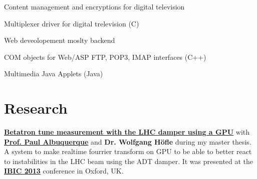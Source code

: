 \documentclass[a4paper]{deedy-resume} %
\begin{document}
\begin{minipage}[t]{0.66\textwidth}
Content management and encryptions for digital television
\begin{tightitemize}
\item Multiplexer driver for digital trelevision (C)
\end{tightitemize}

\sectionspace %



Web deveolopement moslty backend
\begin{tightitemize}
\item COM objects for Web/ASP FTP, POP3, IMAP interfaces (C++)
\item Multimedia Java Applets (Java)
\end{tightitemize}

\sectionspace %

\end{minipage} %


\newpage %


\section{Research}


\textbf{\href{http://cds.cern.ch/record/1545785?ln=en}{Betatron tune measurement with the LHC damper using a GPU}}
with
\textbf{\href{http://ch.linkedin.com/pub/paul-albuquerque/12/366/809}{Prof. Paul Albuquerque}}
and \textbf{Dr. Wolfgang Höf\/le} during my master thesis.
A system to make realtime fourrier transform
on GPU to be able to better react to instabilities in the LHC beam using the ADT
damper. It was presented at the
\textbf{\href{http://www.ibic2013.org}{IBIC 2013}}
conference in Oxford, UK.
\end{document}

